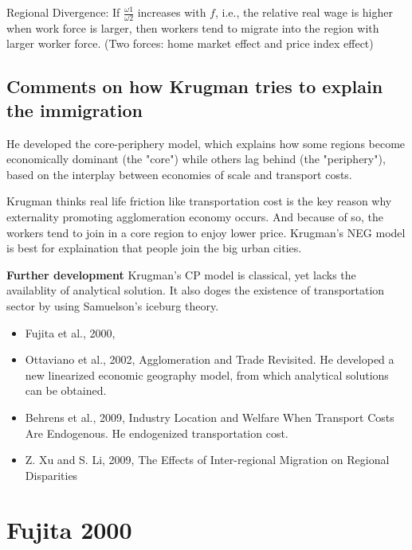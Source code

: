 \documentclass{article}
\numberwithin{equation}{section} %
\begin{document}
Regional Divergence: If $\frac{\omega1}{\omega2}$ increases with $f$, i.e., the relative real wage is  higher when work force is larger, then workers tend to migrate into the region  with larger worker force. (Two forces: home market effect and price index  effect)

\subsection{Comments on how Krugman tries to explain the immigration} %
\label{sub:comments_on_how_krugman_tries_to_explain_the_immigration}

He developed the core-periphery model, which explains how some regions become economically dominant (the "core") while others lag behind (the "periphery"), based on the interplay between economies of scale and transport costs.

Krugman thinks real life friction like transportation cost is the key reason why externality promoting agglomeration economy occurs. And because of so, the workers tend to join in a core region to enjoy lower price. Krugman's NEG model is best for explaination that people join the big urban cities.

\textbf{Further development}
Krugman's CP model is classical, yet lacks the availablity of analytical solution. It also doges the existence of transportation sector by using Samuelson's iceburg theory.

\begin{itemize}
  \item Fujita et al., 2000, 
  \item Ottaviano et al., 2002, Agglomeration and Trade Revisited. He developed a new linearized economic geography model, from which analytical solutions can be obtained.
  \item Behrens et al., 2009, Industry Location and Welfare When Transport Costs Are Endogenous. He endogenized transportation cost.
  \item Z. Xu and S. Li, 2009, The Effects of Inter-regional Migration on Regional Disparities
\end{itemize}


\section{Fujita 2000} %
\label{sec:fujita_2000}
\end{document}
